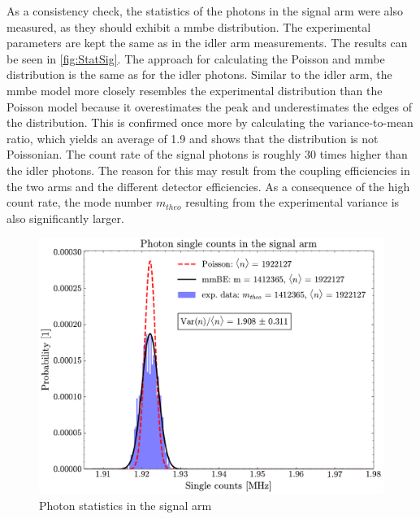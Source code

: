 As a consistency check, the statistics of the photons in the signal arm were also measured, as they should exhibit a \acrshort{mmbe} distribution. The experimental parameters are kept the same as in the idler arm measurements. \newline
The results can be seen in \autoref{fig:StatSig}. The approach for calculating the Poisson and \acrshort{mmbe} distribution is the same as for the idler photons. Similar to the idler arm, the \acrshort{mmbe} model more closely resembles the experimental distribution than the Poisson model because it overestimates the peak and underestimates the edges of the distribution. This is confirmed once more by calculating the variance-to-mean ratio, which yields an average of 1.9 and shows that the distribution is not Poissonian. \newline
The count rate of the signal photons is roughly 30 times higher than the idler photons. The reason for this may result from the coupling efficiencies in the two arms and the different detector efficiencies. As a consequence of the high count rate, the mode number $m_{theo}$ resulting from the experimental variance is also significantly larger.
\begin{figure}[tb!]
	\centering
	\includegraphics[width=.7\textwidth]{Images/SingleStatisticsSignal.pdf}
	\caption{Photon statistics in the signal arm}
	\label{fig:StatSig}
\end{figure}

